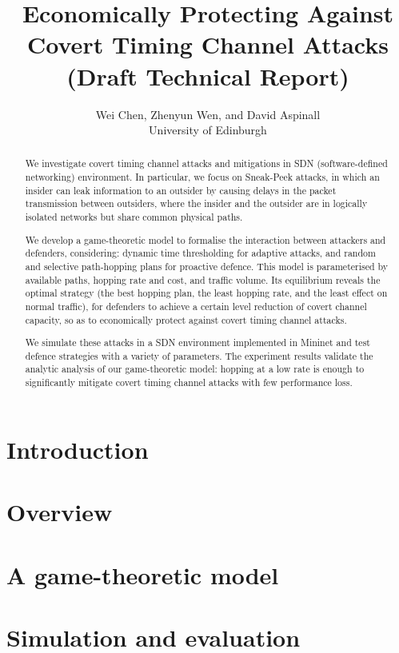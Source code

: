 \documentclass[a4paper,11pt]{article}
\title{Economically Protecting Against Covert Timing Channel Attacks\\
(Draft Technical Report)}
\author{Wei Chen, Zhenyun Wen, and David Aspinall\\ 
University of Edinburgh}
\begin{document}
\maketitle
\begin{abstract}
We investigate covert timing channel attacks and mitigations in SDN
(software-defined networking) environment. In particular, we focus on Sneak-Peek
attacks, in which an insider can leak information to an outsider by causing
delays in the packet transmission between outsiders, where the insider and the
outsider are in logically isolated networks but share common physical paths.

We develop a game-theoretic model to formalise the interaction between attackers
and defenders, considering: dynamic time thresholding for adaptive attacks, and
random and selective path-hopping plans for proactive defence. This model is
parameterised by available paths, hopping rate and cost, and traffic volume. Its
equilibrium reveals the optimal strategy (the best hopping plan, the least
hopping rate, and the least effect on normal traffic), for defenders to achieve
a certain level reduction of covert channel capacity, so as to economically
protect against covert timing channel attacks.

We simulate these attacks in a SDN environment implemented in Mininet and test
defence strategies with a variety of parameters. The experiment results validate
the analytic analysis of our game-theoretic model: hopping at a low rate is
enough to significantly mitigate covert timing channel attacks with few
performance loss. 
\end{abstract}
\section{Introduction}
\section{Overview}
\section{A game-theoretic model}
\section{Simulation and evaluation}
\end{document}
